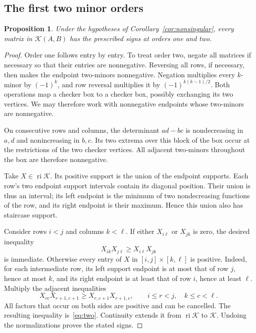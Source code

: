 \documentclass[11pt]{article}
\newtheorem{proposition}[theorem]{Proposition}
\theoremstyle{definition}
\theoremstyle{remark}
\numberwithin{equation}{section}
\newcommand{\K}{\mathcal K}
\DeclareMathOperator{\ri}{ri}
\begin{document}
\subsection{The first two minor orders}

\begin{proposition}\label{prop:ordertwo}
Under the hypotheses of Corollary~\ref{cor:nonsingular}, every matrix
in $\K(A,B)$ has the prescribed signs at orders one and two.
\end{proposition}

\begin{proof}
Order one follows entry by entry. To treat order two, negate all
matrices if necessary so that their entries are nonnegative. Reversing
all rows, if necessary, then makes the endpoint two-minors
nonnegative. Negation multiplies every $k$-minor by $(-1)^k$, and
row reversal multiplies it by $(-1)^{k(k-1)/2}$. Both operations map a
checker box to a checker box, possibly exchanging its two vertices.
We may therefore work with nonnegative endpoints whose two-minors
are nonnegative.

On consecutive rows and columns, the determinant $ad-bc$ is
nondecreasing in $a,d$ and nonincreasing in $b,c$. Its two extrema
over this block of the box occur at the restrictions of the two checker
vertices. All adjacent two-minors throughout the box are therefore
nonnegative.

Take $X\in\ri\K$. Its positive support is the union of the endpoint
supports. Each row's two endpoint support intervals contain its
diagonal position. Their union is thus an interval; its left endpoint
is the minimum of two nondecreasing functions of the row, and its
right endpoint is their maximum. Hence this union also has staircase
support.

Consider rows $i<j$ and columns $k<\ell$. If either $X_{i\ell}$ or
$X_{jk}$ is zero, the desired inequality
\begin{equation}\label{eq:two}
 X_{ik}X_{j\ell}\geq X_{i\ell}X_{jk}
\end{equation}
is immediate. Otherwise every entry of $X$ in
$[i,j]\times[k,\ell]$ is positive. Indeed, for each intermediate row,
its left support endpoint is at most that of row $j$, hence at most
$k$, and its right endpoint is at least that of row $i$, hence at
least $\ell$. Multiply the adjacent inequalities
\[
 X_{rc}X_{r+1,c+1}\geq X_{r,c+1}X_{r+1,c},
 \qquad i\leq r<j,\quad k\leq c<\ell.
\]
All factors that occur on both sides are positive and can be
cancelled. The resulting inequality is~\eqref{eq:two}.
Continuity extends it from $\ri\K$ to $\K$. Undoing the
normalizations proves the stated signs.
\end{proof}
\end{document}
